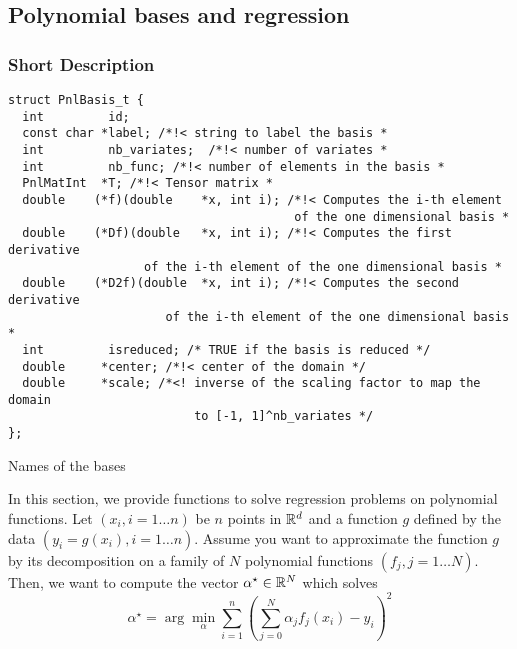 \subsection{Polynomial bases and regression}
\subsubsection{Short Description}

\begin{verbatim}
struct PnlBasis_t {
  int         id;
  const char *label; /*!< string to label the basis *
  int         nb_variates;  /*!< number of variates *
  int         nb_func; /*!< number of elements in the basis *
  PnlMatInt  *T; /*!< Tensor matrix *
  double    (*f)(double    *x, int i); /*!< Computes the i-th element
                                        of the one dimensional basis *
  double    (*Df)(double   *x, int i); /*!< Computes the first derivative
                   of the i-th element of the one dimensional basis *
  double    (*D2f)(double  *x, int i); /*!< Computes the second derivative
                      of the i-th element of the one dimensional basis *
  int         isreduced; /* TRUE if the basis is reduced */
  double     *center; /*!< center of the domain */
  double     *scale; /*<! inverse of the scaling factor to map the domain 
                          to [-1, 1]^nb_variates */
};
\end{verbatim}

\begin{table}[h!]
  \begin{describeconst}
  \end{describeconst}
  \caption{Names of the bases}
  \label{basis_index}
\end{table}

In this section, we provide functions to solve regression problems on
polynomial functions. Let $(x_i, i=1 \dots n)$ be $n$ points in ${\mathbb R}^d$ and a
function $g$ defined by the data $(y_i = g(x_i), i=1 \dots n)$. Assume you
want to approximate the function $g$ by its decomposition on a family of $N$
polynomial functions $(f_j, j=1\dots N)$. Then, we want to compute the vector
$\alpha^\star \in {\mathbb R}^N$ which solves
\begin{equation*} \alpha^\star = \arg\min_\alpha \sum_{i=1}^{n}
  \left(\sum_{j=0}^N \alpha_j f_j(x_i) - y_i\right)^2
\end{equation*}

